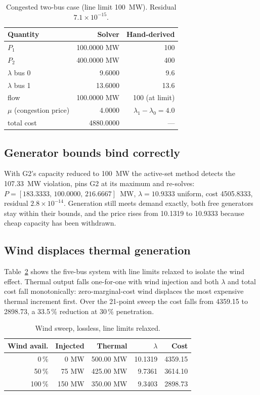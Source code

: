 \documentclass[conference]{IEEEtran}
\begin{document}
\begin{table}[t]
\caption{Congested two-bus case (line limit 100~MW). Residual $7.1\times10^{-15}$.}
\label{tab:cong}
\centering
\begin{tabular}{@{}lrr@{}}
\toprule
Quantity & Solver & Hand-derived \\
\midrule
$P_1$ & 100.0000 MW & 100 \\
$P_2$ & 400.0000 MW & 400 \\
$\lambda$ bus 0 & 9.6000 & 9.6 \\
$\lambda$ bus 1 & 13.6000 & 13.6 \\
flow & 100.0000 MW & 100 (at limit) \\
$\mu$ (congestion price) & 4.0000 & $\lambda_1-\lambda_0 = 4.0$ \\
total cost & 4880.0000 & --- \\
\bottomrule
\end{tabular}
\end{table}

\subsection{Generator bounds bind correctly}
With G2's capacity reduced to 100~MW the active-set method detects the 107.33~MW violation, pins G2 at its maximum and re-solves: $P=[183.3333,\,100.0000,\,216.6667]$~MW, $\lambda=10.9333$ uniform, cost 4505.8333, residual $2.8\times10^{-14}$. Generation still meets demand exactly, both free generators stay within their bounds, and the price rises from 10.1319 to 10.9333 because cheap capacity has been withdrawn.

\subsection{Wind displaces thermal generation}
Table~\ref{tab:wind} shows the five-bus system with line limits relaxed to isolate the wind effect. Thermal output falls one-for-one with wind injection and both $\lambda$ and total cost fall monotonically: zero-marginal-cost wind displaces the most expensive thermal increment first. Over the 21-point sweep the cost falls from 4359.15 to 2898.73, a 33.5\,\% reduction at 30\,\% penetration.

\begin{table}[t]
\caption{Wind sweep, lossless, line limits relaxed.}
\label{tab:wind}
\centering
\begin{tabular}{@{}rrrrr@{}}
\toprule
Wind avail. & Injected & Thermal & $\lambda$ & Cost \\
\midrule
0\,\% & 0 MW & 500.00 MW & 10.1319 & 4359.15 \\
50\,\% & 75 MW & 425.00 MW & 9.7361 & 3614.10 \\
100\,\% & 150 MW & 350.00 MW & 9.3403 & 2898.73 \\
\bottomrule
\end{tabular}
\end{table}
\end{document}
